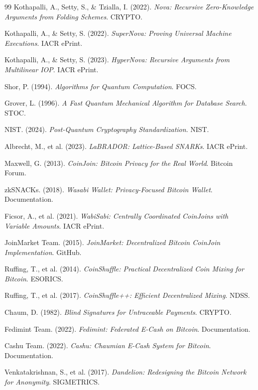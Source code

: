 \documentclass[11pt,a4paper,twoside]{book}
\begin{document}
\begin{thebibliography}{99}
 Kothapalli, A., Setty, S., \& Tzialla, I. (2022). \textit{Nova: Recursive Zero-Knowledge Arguments from Folding Schemes}. CRYPTO.

 Kothapalli, A., \& Setty, S. (2022). \textit{SuperNova: Proving Universal Machine Executions}. IACR ePrint.

 Kothapalli, A., \& Setty, S. (2023). \textit{HyperNova: Recursive Arguments from Multilinear IOP}. IACR ePrint.

 Shor, P. (1994). \textit{Algorithms for Quantum Computation}. FOCS.

 Grover, L. (1996). \textit{A Fast Quantum Mechanical Algorithm for Database Search}. STOC.

 NIST. (2024). \textit{Post-Quantum Cryptography Standardization}. NIST.

 Albrecht, M., et al. (2023). \textit{LaBRADOR: Lattice-Based SNARKs}. IACR ePrint.


 Maxwell, G. (2013). \textit{CoinJoin: Bitcoin Privacy for the Real World}. Bitcoin Forum.

 zkSNACKs. (2018). \textit{Wasabi Wallet: Privacy-Focused Bitcoin Wallet}. Documentation.

 Ficsor, A., et al. (2021). \textit{WabiSabi: Centrally Coordinated CoinJoins with Variable Amounts}. IACR ePrint.

 JoinMarket Team. (2015). \textit{JoinMarket: Decentralized Bitcoin CoinJoin Implementation}. GitHub.

 Ruffing, T., et al. (2014). \textit{CoinShuffle: Practical Decentralized Coin Mixing for Bitcoin}. ESORICS.

 Ruffing, T., et al. (2017). \textit{CoinShuffle++: Efficient Decentralized Mixing}. NDSS.

 Chaum, D. (1982). \textit{Blind Signatures for Untraceable Payments}. CRYPTO.

 Fedimint Team. (2022). \textit{Fedimint: Federated E-Cash on Bitcoin}. Documentation.

 Cashu Team. (2022). \textit{Cashu: Chaumian E-Cash System for Bitcoin}. Documentation.

 Venkatakrishnan, S., et al. (2017). \textit{Dandelion: Redesigning the Bitcoin Network for Anonymity}. SIGMETRICS.


\end{thebibliography}
\end{document}
